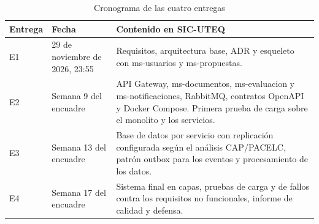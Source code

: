 \begin{table}[ht]
\centering
\small
\caption{Cronograma de las cuatro entregas}\label{tab:cronograma}
\begin{tabularx}{\textwidth}{@{}L{1.6cm}L{3.2cm}Y@{}}
\toprule
Entrega & Fecha & Contenido en SIC-UTEQ \\
\midrule
E1 & 29 de noviembre de 2026, 23:55 & Requisitos, arquitectura base, ADR y esqueleto con ms-usuarios y ms-propuestas. \\
E2 & Semana 9 del encuadre & API Gateway, ms-documentos, ms-evaluacion y ms-notificaciones, RabbitMQ, contratos OpenAPI y Docker Compose. Primera prueba de carga sobre el monolito y los servicios. \\
E3 & Semana 13 del encuadre & Base de datos por servicio con replicación configurada según el análisis CAP/PACELC, patrón outbox para los eventos y procesamiento de los datos. \\
E4 & Semana 17 del encuadre & Sistema final en capas, pruebas de carga y de fallos contra los requisitos no funcionales, informe de calidad y defensa. \\
\bottomrule
\end{tabularx}
\end{table}
